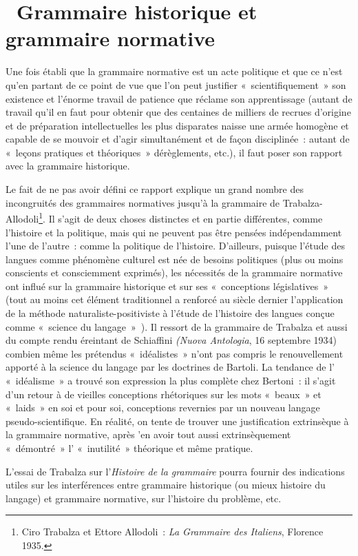 \documentclass[french,twoside]{book} %
\begin{document}
\section[{ Grammaire historique et grammaire normative}]{ Grammaire historique et grammaire normative}
\noindent Une fois établi que la grammaire normative est un acte politique et que ce n’est qu’en partant de ce point de vue que l’on peut justifier « scientifiquement » son existence et l’énorme travail de patience que réclame son apprentissage (autant de travail qu’il en faut pour obtenir que des centaines de milliers de recrues d’origine et de préparation intellectuelles les plus disparates naisse une armée homogène et capable de se mouvoir et d’agir simultanément et de façon disciplinée : autant de « leçons pratiques et théoriques » dérèglements, etc.), il faut poser son rapport avec la grammaire historique.\par
Le fait de ne pas avoir défini ce rapport explique un grand nombre des incongruités des grammaires normatives jusqu’à la grammaire de Trabalza-Allodoli\footnote{Ciro Trabalza et Ettore Allodoli : \emph{La Grammaire des Italiens}, Florence 1935.}. Il s’agit de deux choses distinctes et en partie différentes, comme l’histoire et la politique, mais qui ne peuvent pas être pensées indépendamment l’une de l’autre : comme la politique de l’histoire. D'ailleurs, puisque l’étude des langues comme phénomène culturel est née de besoins politiques (plus ou moins conscients et consciemment exprimés), les nécessités de la grammaire normative ont influé sur la grammaire historique et sur ses « conceptions législatives » (tout au moins cet élément traditionnel a renforcé au siècle dernier l’application de la méthode naturaliste-positiviste à l’étude de l’histoire des langues conçue comme « science du langage » ). Il ressort de la grammaire de Trabalza et aussi du compte rendu éreintant de Schiaffini \emph{(Nuova Antologia}, 16 septembre 1934) combien même les prétendus « idéalistes » n’ont pas compris le renouvellement apporté à la science du langage par les doctrines de Bartoli. La tendance de l’ « idéalisme » a trouvé son expression la plus complète chez Bertoni : il s’agit d’un retour à de vieilles conceptions rhétoriques sur les mots « beaux » et « laids » en soi et pour soi, conceptions revernies par un nouveau langage pseudo-scientifique. En réalité, on tente de trouver une justification extrinsèque à la grammaire normative, après 'en avoir tout aussi extrinsèquement « démontré » l’ « inutilité » théorique et même pratique.\par
L'essai de Trabalza sur l’\emph{Histoire de la grammaire} pourra fournir des indications utiles sur les interférences entre grammaire historique (ou mieux histoire du langage) et grammaire normative, sur l’histoire du problème, etc.
\end{document}
